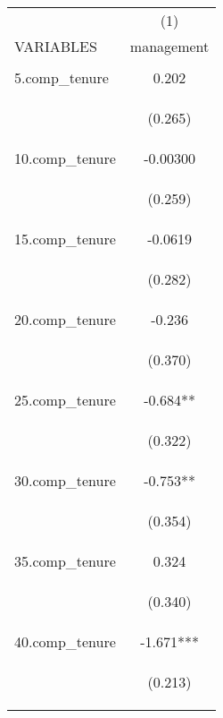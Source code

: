 \begin{center}
\begin{tabular}{lc} \hline
 & (1) \\
VARIABLES & management \\ \hline
\vspace{4pt} & \begin{footnotesize}\end{footnotesize} \\
5.comp\_tenure & 0.202 \\
\vspace{4pt} & \begin{footnotesize}(0.265)\end{footnotesize} \\
10.comp\_tenure & -0.00300 \\
\vspace{4pt} & \begin{footnotesize}(0.259)\end{footnotesize} \\
15.comp\_tenure & -0.0619 \\
\vspace{4pt} & \begin{footnotesize}(0.282)\end{footnotesize} \\
20.comp\_tenure & -0.236 \\
\vspace{4pt} & \begin{footnotesize}(0.370)\end{footnotesize} \\
25.comp\_tenure & -0.684** \\
\vspace{4pt} & \begin{footnotesize}(0.322)\end{footnotesize} \\
30.comp\_tenure & -0.753** \\
\vspace{4pt} & \begin{footnotesize}(0.354)\end{footnotesize} \\
35.comp\_tenure & 0.324 \\
\vspace{4pt} & \begin{footnotesize}(0.340)\end{footnotesize} \\
40.comp\_tenure & -1.671*** \\
\vspace{4pt} & \begin{footnotesize}(0.213)\end{footnotesize} \\

\end{tabular}
\end{center}
